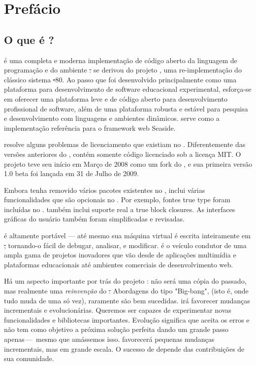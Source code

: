 \documentclass[a4paper,10pt,twoside]{book}
\begin{document}
	\sloppy
	\frontmatter
\fi
\chapter{Prefácio}

\section*{O que é \pharo?}

\pharo é uma completa e moderna implementação de código aberto da linguagem de programação e do ambiente \st. \pharo se derivou do projeto \squeak\cite{Inga97a}, uma re-implementação do clássico sistema \st-80. Ao passo que \squeak foi desenvolvido principalmente como uma plataforma para desenvolvimento de software educacional experimental, \pharo esforça-se em oferecer uma plataforma leve e de código aberto para desenvolvimento profissional de software, além de uma plataforma robusta e estável para pesquisa e desenvolvimento com linguagens e ambientes dinâmicos. \pharo serve como a implementação referência para o framework web Seaside.

\pharo resolve alguns problemas de licenciamento que existiam no \squeak. Diferentemente das versões anteriores do \squeak, \pharo contém somente código licenciado sob a licença MIT. O projeto \pharo teve seu início em Março de 2008 como um fork do , e sua primeira versão 1.0 beta foi lançada em 31 de Julho de 2009.

Embora tenha removido vários pacotes existentes no \squeak, \pharo inclui várias funcionalidades que são opcionais no \squeak. Por exemplo, fontes true type foram incluídas no \pharo. \pharo também inclui suporte real a true block closures. As interfaces gráficas do usuário também foram simplificadas e revisadas.

\pharo é altamente portável --- até mesmo sua máquina virtual é escrita inteiramente em \st, tornando-o fácil de debugar, analisar, e modificar. \pharo é o veículo condutor de uma ampla gama de projetos inovadores que vão desde de aplicações multimídia e plataformas educacionais até ambientes comerciais de desenvolvimento web. 

Há um aspecto importante por trás do projeto \pharo: \pharo não será uma cópia do passado, mas realmente uma \emph{reinvenção} do \st. Abordagens do tipo "Big-bang", (isto é, onde tudo muda de uma só vez), raramente são bem sucedidas. \pharo irá favorecer mudanças incrementais e evolucionárias. Queremos ser capazes de experimentar novas funcionalidades e bibliotecas importantes. Evolução significa que \pharo aceita os erros e não tem como objetivo a próxima solução perfeita dando um grande passo apenas\,---\, mesmo que amássemos isso. \pharo favorecerá pequenas mudanças incrementais, mas em grande escala. O sucesso de \pharo depende das contribuições de sua comunidade.
\end{document}
